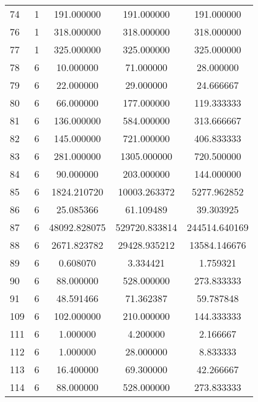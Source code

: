 \documentclass[a4paper,12pt]{article}
\begin{document}
\begin{center}
\begin{longtable}{l S[table-format=3.0] S[table-format=8.2] S[table-format=8.2] S[table-format=8.2]}
          74   &   1   &   191.000000   &    191.000000     &     191.000000 \\
          76   &   1   &   318.000000   &    318.000000     &     318.000000 \\
          77   &   1   &   325.000000   &    325.000000     &     325.000000 \\
          78   &   6   &    10.000000   &     71.000000     &      28.000000 \\
          79   &   6   &    22.000000   &     29.000000     &      24.666667 \\
          80   &   6   &    66.000000   &    177.000000     &     119.333333 \\
          81   &   6   &   136.000000   &    584.000000     &     313.666667 \\
          82   &   6   &   145.000000   &    721.000000     &     406.833333 \\
          83   &   6   &   281.000000   &   1305.000000     &     720.500000 \\
          84   &   6   &    90.000000   &    203.000000     &     144.000000 \\
          85   &   6   & 1824.210720   &   10003.263372     &    5277.962852 \\
          86   &   6   &   25.085366   &     61.109489     &      39.303925 \\
          87   &   6   & 48092.828075   &  529720.833814     &   244514.640169 \\
         88   &   6   & 2671.823782   &   29428.935212     &    13584.146676 \\
         89   &   6   &    0.608070   &      3.334421     &      1.759321 \\
         90   &   6   &   88.000000   &    528.000000     &     273.833333 \\
         91   &   6   &   48.591466   &     71.362387     &      59.787848 \\
        109   &   6   &  102.000000   &    210.000000     &     144.333333 \\
                111   &   6   &    1.000000   &      4.200000     &       2.166667 \\
        112   &   6   &    1.000000   &     28.000000     &       8.833333 \\
        113   &   6   &   16.400000   &     69.300000     &      42.266667 \\
        114   &   6   &   88.000000   &    528.000000     &     273.833333 \\

\end{longtable}
\end{center}
\end{document}

